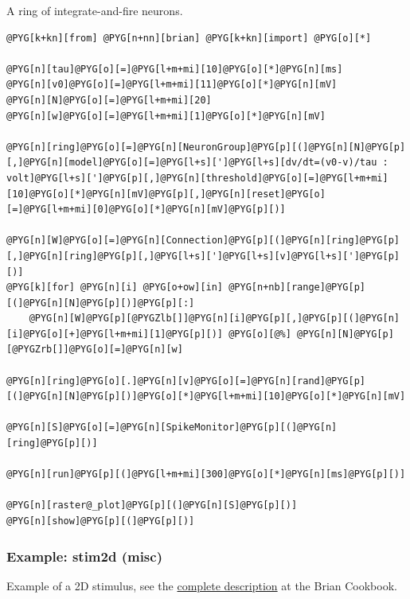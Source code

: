 \documentclass[letterpaper,10pt,english]{manual}
\begin{document}
A ring of integrate-and-fire neurons.

\begin{Verbatim}[commandchars=@\[\]]
@PYG[k+kn][from] @PYG[n+nn][brian] @PYG[k+kn][import] @PYG[o][*]

@PYG[n][tau]@PYG[o][=]@PYG[l+m+mi][10]@PYG[o][*]@PYG[n][ms]
@PYG[n][v0]@PYG[o][=]@PYG[l+m+mi][11]@PYG[o][*]@PYG[n][mV]
@PYG[n][N]@PYG[o][=]@PYG[l+m+mi][20]
@PYG[n][w]@PYG[o][=]@PYG[l+m+mi][1]@PYG[o][*]@PYG[n][mV]

@PYG[n][ring]@PYG[o][=]@PYG[n][NeuronGroup]@PYG[p][(]@PYG[n][N]@PYG[p][,]@PYG[n][model]@PYG[o][=]@PYG[l+s][']@PYG[l+s][dv/dt=(v0-v)/tau : volt]@PYG[l+s][']@PYG[p][,]@PYG[n][threshold]@PYG[o][=]@PYG[l+m+mi][10]@PYG[o][*]@PYG[n][mV]@PYG[p][,]@PYG[n][reset]@PYG[o][=]@PYG[l+m+mi][0]@PYG[o][*]@PYG[n][mV]@PYG[p][)]

@PYG[n][W]@PYG[o][=]@PYG[n][Connection]@PYG[p][(]@PYG[n][ring]@PYG[p][,]@PYG[n][ring]@PYG[p][,]@PYG[l+s][']@PYG[l+s][v]@PYG[l+s][']@PYG[p][)]
@PYG[k][for] @PYG[n][i] @PYG[o+ow][in] @PYG[n+nb][range]@PYG[p][(]@PYG[n][N]@PYG[p][)]@PYG[p][:]
    @PYG[n][W]@PYG[p][@PYGZlb[]]@PYG[n][i]@PYG[p][,]@PYG[p][(]@PYG[n][i]@PYG[o][+]@PYG[l+m+mi][1]@PYG[p][)] @PYG[o][@%] @PYG[n][N]@PYG[p][@PYGZrb[]]@PYG[o][=]@PYG[n][w]

@PYG[n][ring]@PYG[o][.]@PYG[n][v]@PYG[o][=]@PYG[n][rand]@PYG[p][(]@PYG[n][N]@PYG[p][)]@PYG[o][*]@PYG[l+m+mi][10]@PYG[o][*]@PYG[n][mV]

@PYG[n][S]@PYG[o][=]@PYG[n][SpikeMonitor]@PYG[p][(]@PYG[n][ring]@PYG[p][)]

@PYG[n][run]@PYG[p][(]@PYG[l+m+mi][300]@PYG[o][*]@PYG[n][ms]@PYG[p][)]

@PYG[n][raster@_plot]@PYG[p][(]@PYG[n][S]@PYG[p][)]
@PYG[n][show]@PYG[p][(]@PYG[p][)]
\end{Verbatim}

\resetcurrentobjects
\hypertarget{--doc-examples-misc_stim2d}{}

\hypertarget{index-67}{}\subsubsection{Example: stim2d (misc)}

Example of a 2D stimulus, see the
\href{http://neuralensemble.org/cookbook/wiki/Brian/StimulusArrayGroup}{complete description}
at the Brian Cookbook.
\end{document}
